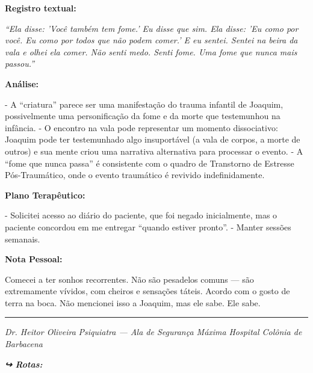 \noindent \textbf{Registro textual:}

\noindent \textit{\textquotedblleft{}Ela disse: 'Você também tem fome.' Eu disse que sim. Ela disse: 'Eu como por você. Eu como por todos que não podem comer.' E eu sentei. Sentei na beira da vala e olhei ela comer. Não senti medo. Senti fome. Uma fome que nunca mais passou.\textquotedblright{}}

\noindent \textbf{Análise:}

\noindent - A \textquotedblleft{}criatura\textquotedblright{} parece ser uma manifestação do trauma infantil de Joaquim, possivelmente uma personificação da fome e da morte que testemunhou na infância.
- O encontro na vala pode representar um momento dissociativo: Joaquim pode ter testemunhado algo insuportável (a vala de corpos, a morte de outros) e sua mente criou uma narrativa alternativa para processar o evento.
- A \textquotedblleft{}fome que nunca passa\textquotedblright{} é consistente com o quadro de Transtorno de Estresse Pós-Traumático, onde o evento traumático é revivido indefinidamente.

\noindent \textbf{Plano Terapêutico:}

\noindent - Solicitei acesso ao diário do paciente, que foi negado inicialmente, mas o paciente concordou em me entregar \textquotedblleft{}quando estiver pronto\textquotedblright{}.
- Manter sessões semanais.

\noindent \textbf{Nota Pessoal:}

\noindent Comecei a ter sonhos recorrentes. Não são pesadelos comuns --- são extremamente vívidos, com cheiros e sensações táteis. Acordo com o gosto de terra na boca. Não mencionei isso a Joaquim, mas ele sabe. Ele sabe.

\vspace{0.5em}\noindent\rule{\textwidth}{0.5pt}\vspace{0.5em}

\noindent \textit{Dr. Heitor Oliveira}
\textit{Psiquiatra --- Ala de Segurança Máxima}
\textit{Hospital Colônia de Barbacena}

\vspace{0.5em}
\noindent\textit{\textbf{↪ Rotas:}  \rotasep {} \rotasep {}}
